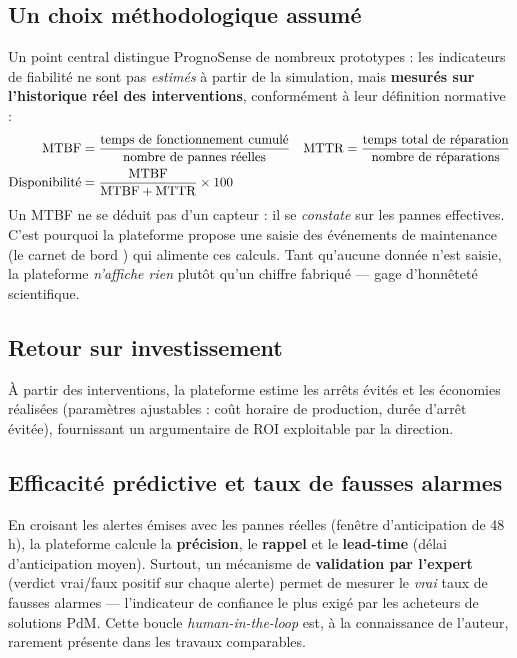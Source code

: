 \subsection{Un choix méthodologique assumé}
Un point central distingue PrognoSense de nombreux prototypes : les indicateurs de fiabilité
ne sont pas \emph{estimés} à partir de la simulation, mais \textbf{mesurés sur l'historique
réel des interventions}, conformément à leur définition normative :
\begin{align}
\text{MTBF} &= \frac{\text{temps de fonctionnement cumulé}}{\text{nombre de pannes réelles}} &
\text{MTTR} &= \frac{\text{temps total de réparation}}{\text{nombre de réparations}} \\
\text{Disponibilité} &= \frac{\text{MTBF}}{\text{MTBF}+\text{MTTR}}\times 100 & & \notag
\end{align}
Un MTBF ne se déduit pas d'un capteur : il se \emph{constate} sur les pannes effectives.
C'est pourquoi la plateforme propose une saisie des événements de maintenance (le \og carnet
de bord \fg) qui alimente ces calculs. Tant qu'aucune donnée n'est saisie, la plateforme
\emph{n'affiche rien} plutôt qu'un chiffre fabriqué --- gage d'honnêteté scientifique.

\subsection{Retour sur investissement}
À partir des interventions, la plateforme estime les arrêts évités et les économies
réalisées (paramètres ajustables : coût horaire de production, durée d'arrêt évitée),
fournissant un argumentaire de ROI exploitable par la direction.

\subsection{Efficacité prédictive et taux de fausses alarmes}
En croisant les alertes émises avec les pannes réelles (fenêtre d'anticipation de 48\,h), la
plateforme calcule la \textbf{précision}, le \textbf{rappel} et le \textbf{lead-time}
(délai d'anticipation moyen). Surtout, un mécanisme de \textbf{validation par l'expert}
(verdict vrai/faux positif sur chaque alerte) permet de mesurer le \emph{vrai} taux de
fausses alarmes --- l'indicateur de confiance le plus exigé par les acheteurs de solutions
PdM. Cette boucle \emph{human-in-the-loop} est, à la connaissance de l'auteur, rarement
présente dans les travaux comparables.

